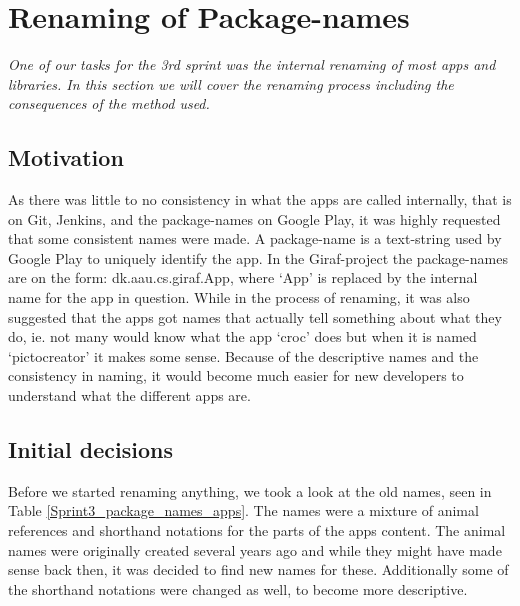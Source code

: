 \section{Renaming of Package-names} \label{Sprint3_name}
\textit{One of our tasks for the 3rd sprint was the internal renaming of most apps and libraries. In this section we will cover the renaming process including the consequences of the method used.}

\subsection{Motivation}
As there was little to no consistency in what the apps are called internally, that is on Git, Jenkins, and the package-names on Google Play, it was highly requested that some consistent names were made. A package-name is a text-string used by Google Play to uniquely identify the app. In the Giraf-project the package-names are on the form: dk.aau.cs.giraf.App, where ‘App’ is replaced by the internal name for the app in question.
While in the process of renaming, it was also suggested that the apps got names that actually tell something about what they do, ie. not many would know what the app ‘croc’ does but when it is named ‘pictocreator’ it makes some sense. Because of the descriptive names and the consistency in naming, it would become much easier for new developers to understand what the different apps are.

\subsection{Initial decisions}
Before we started renaming anything, we took a look at the old names, seen in Table \ref{Sprint3_package_names_apps}. The names were a mixture of animal references and shorthand notations for the parts of the apps content. The animal names were originally created several years ago and while they might have made sense back then, it was decided to find new names for these. Additionally some of the shorthand notations were changed as well, to become more descriptive.

